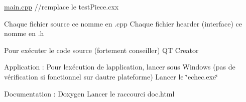 \mbox{\hyperlink{main_8cpp}{main.\+cpp}} //remplace le test\+Piece.\+cxx

Chaque fichier source ce nomme en .cpp Chaque fichier hearder (interface) ce nomme en .h

Pour exécuter le code source (fortement conseiller) QT Creator

Application \+: Pour l\textquotesingle{}exécution de l\textquotesingle{}application, lancer sous Windows (pas de vérification si fonctionnel sur d\textquotesingle{}autre plateforme) Lancer le \char`\"{}echec.\+exe\char`\"{}

Documentation \+: Doxygen Lancer le raccourci doc.\+html 